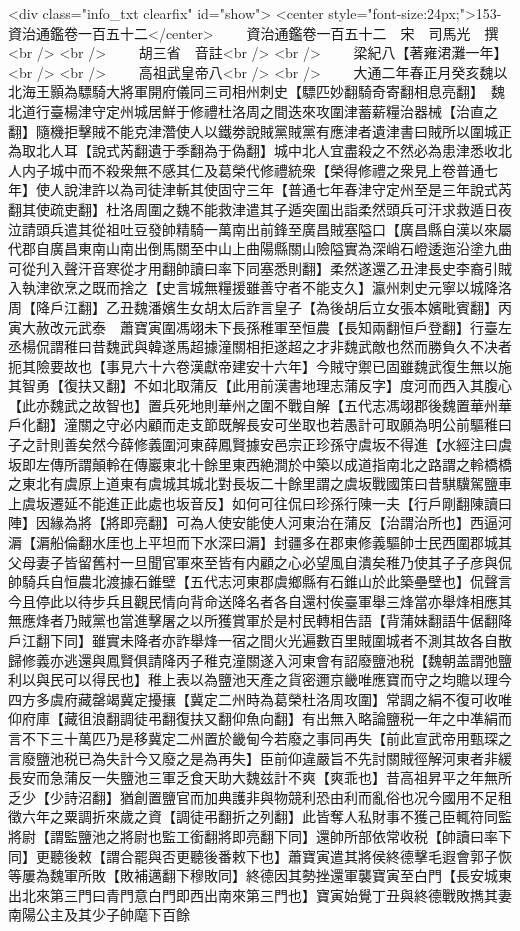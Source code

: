 <div class="info_txt clearfix" id="show">
<center style="font-size:24px;">153-資治通鑑卷一百五十二</center>
  　　資治通鑑卷一百五十二　宋　司馬光　撰<br />
<br />
　　胡三省　音註<br />
<br />
　　梁紀八【著雍涒灘一年】<br />
<br />
　　高祖武皇帝八<br />
<br />
　　大通二年春正月癸亥魏以北海王顥為驃騎大將軍開府儀同三司相州刺史【驃匹妙翻騎奇寄翻相息亮翻】　魏北道行臺楊津守定州城居鮮于修禮杜洛周之間迭來攻圍津蓄薪糧治器械【治直之翻】隨機拒擊賊不能克津濳使人以鐵劵說賊黨賊黨有應津者遺津書曰賊所以圍城正為取北人耳【說式芮翻遺于季翻為于偽翻】城中北人宜盡殺之不然必為患津悉收北人内子城中而不殺衆無不感其仁及葛榮代修禮統衆【榮得修禮之衆見上卷普通七年】使人說津許以為司徒津斬其使固守三年【普通七年春津守定州至是三年說式芮翻其使疏吏翻】杜洛周圍之魏不能救津遣其子遁突圍出詣柔然頭兵可汗求救遁日夜泣請頭兵遣其從祖吐豆發帥精騎一萬南出前鋒至廣昌賊塞隘口【廣昌縣自漢以來屬代郡自廣昌東南山南出倒馬關至中山上曲陽縣關山險隘實為深峭石嶝逶迤沿塗九曲可從刋入聲汗音寒從才用翻帥讀曰率下同塞悉則翻】柔然遂還乙丑津長史李裔引賊入執津欲烹之既而捨之【史言城無糧援雖善守者不能支久】瀛州刺史元寧以城降洛周【降戶江翻】乙丑魏潘嬪生女胡太后詐言皇子【為後胡后立女張本嬪毗賓翻】丙寅大赦改元武泰　蕭寶寅圍馮翊未下長孫稚軍至恒農【長知兩翻恒戶登翻】行臺左丞楊侃謂稚曰昔魏武與韓遂馬超據潼關相拒遂超之才非魏武敵也然而勝負久不决者扼其險要故也【事見六十六卷漢獻帝建安十六年】今賊守禦已固雖魏武復生無以施其智勇【復扶又翻】不如北取蒲反【此用前漢書地理志蒲反字】度河而西入其腹心【此亦魏武之故智也】置兵死地則華州之圍不戰自解【五代志馮翊郡後魏置華州華戶化翻】潼關之守必内顧而走支節既解長安可坐取也若愚計可取願為明公前驅稚曰子之計則善矣然今薛修義圍河東薛鳳賢據安邑宗正珍孫守虞坂不得進【水經注曰虞坂即左傳所謂顛軨在傳巖東北十餘里東西絶澗於中築以成道指南北之路謂之軨橋橋之東北有虞原上道東有虞城其城北對長坂二十餘里謂之虞坂戰國策曰昔騏驥駕鹽車上虞坂遷延不能進正此處也坂音反】如何可往侃曰珍孫行陳一夫【行戶剛翻陳讀曰陣】因緣為將【將即亮翻】可為人使安能使人河東治在蒲反【治謂治所也】西逼河漘【漘船倫翻水厓也上平坦而下水深曰漘】封疆多在郡東修義驅帥士民西圍郡城其父母妻子皆留舊村一旦聞官軍來至皆有内顧之心必望風自潰矣稚乃使其子子彦與侃帥騎兵自恒農北渡據石錐壁【五代志河東郡虞鄉縣有石錐山於此築壘壁也】侃聲言今且停此以待步兵且觀民情向背命送降名者各自還村俟臺軍舉三烽當亦舉烽相應其無應烽者乃賊黨也當進擊屠之以所獲賞軍於是村民轉相告語【背蒲妹翻語牛倨翻降戶江翻下同】雖實未降者亦詐舉烽一宿之間火光遍數百里賊圍城者不測其故各自散歸修義亦逃還與鳳賢俱請降丙子稚克潼關遂入河東會有詔廢鹽池税【魏朝盖謂弛鹽利以與民可以得民也】稚上表以為鹽池天產之貨密邇京畿唯應寶而守之均贍以理今四方多虞府藏罄竭冀定擾攘【冀定二州時為葛榮杜洛周攻圍】常調之絹不復可收唯仰府庫【藏徂浪翻調徒弔翻復扶又翻仰魚向翻】有出無入略論鹽税一年之中凖絹而言不下三十萬匹乃是移冀定二州置於畿甸今若廢之事同再失【前此宣武帝用甄琛之言廢鹽池税已為失計今又廢之是為再失】臣前仰違嚴旨不先討關賊徑解河東者非緩長安而急蒲反一失鹽池三軍乏食天助大魏兹計不爽【爽乖也】昔高祖昇平之年無所乏少【少詩沼翻】猶創置鹽官而加典護非與物競利恐由利而亂俗也况今國用不足租徵六年之粟調折來歲之資【調徒弔翻折之列翻】此皆奪人私財事不獲己臣輒符同監將尉【謂監鹽池之將尉也監工銜翻將即亮翻下同】還帥所部依常收税【帥讀曰率下同】更聽後敕【謂合罷與否更聽後番敕下也】蕭寶寅遣其將侯終德擊毛遐會郭子恢等屢為魏軍所敗【敗補邁翻下穆敗同】終德因其勢挫還軍襲寶寅至白門【長安城東出北來第三門曰青門意白門即西出南來第三門也】寶寅始覺丁丑與終德戰敗擕其妻南陽公主及其少子帥麾下百餘